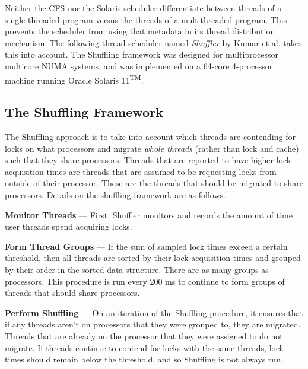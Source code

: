 \documentclass{sig-alternate}
\begin{document}
Neither the CFS nor the Solaris scheduler differentiate between threads of a single-threaded program versus the threads of a multithreaded program. This prevents the scheduler from using that metadata in its thread distribution mechanism. The following thread scheduler named \emph{Shuffler} by Kumar et al. takes this into account. The Shuffling framework was designed for multiprocessor multicore NUMA systems, and was implemented on a 64-core 4-processor machine running Oracle Solaris 11\textsuperscript{TM}.~\cite{Kumar:2014}

\subsection{The Shuffling Framework}

The Shuffling approach is to take into account which threads are contending for locks on what processors and migrate \textit{whole threads} (rather than lock and cache) such that they share processors. Threads that are reported to have higher lock acquisition times are threads that are assumed to be requesting locks from outside of their processor. These are the threads that should be migrated to share processors. Details on the shuffling framework are as follows.

\textbf{Monitor Threads} --- First, Shuffler monitors and records the amount of time user threads spend acquiring locks.

\vspace{1 mm}

\textbf{Form Thread Groups} --- If the sum of sampled lock times exceed a certain threshold, then all threads are sorted by their lock acquisition times and grouped by their order in the sorted data structure. There are as many groups as processors. This procedure is run every 200 ms to continue to form groups of threads that should share processors.

\vspace{1 mm}

\textbf{Perform Shuffling} --- On an iteration of the Shuffling procedure, it ensures that if any threads aren't on processors that they were grouped to, they are migrated. Threads that are already on the processor that they were assigned to do not migrate. If threads continue to contend for locks with the same threads, lock times should remain below the threshold, and so Shuffling is not always run.~\cite{Kumar:2014}

\vspace{1 mm}
\end{document}

